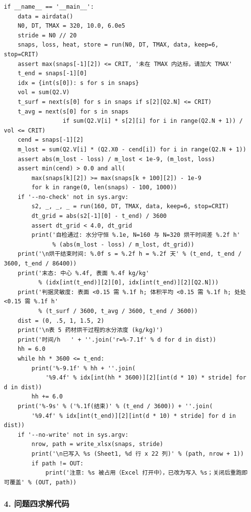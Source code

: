 \documentclass[12pt,a4paper]{article}
\begin{document}
\begin{lstlisting}
if __name__ == '__main__':
    data = airdata()
    N0, DT, TMAX = 320, 10.0, 6.0e5         
    stride = N0 // 20
    snaps, loss, heat, store = run(N0, DT, TMAX, data, keep=6, stop=CRIT)
    assert max(snaps[-1][2]) <= CRIT, '未在 TMAX 内达标，请加大 TMAX'
    t_end = snaps[-1][0]
    idx = {int(s[0]): s for s in snaps}
    vol = sum(Q2.V)
    t_surf = next(s[0] for s in snaps if s[2][Q2.N] <= CRIT)
    t_avg = next(s[0] for s in snaps
                 if sum(Q2.V[i] * s[2][i] for i in range(Q2.N + 1)) / vol <= CRIT)
    cend = snaps[-1][2]
    m_lost = sum(Q2.V[i] * (Q2.X0 - cend[i]) for i in range(Q2.N + 1))
    assert abs(m_lost - loss) / m_lost < 1e-9, (m_lost, loss)
    assert min(cend) > 0.0 and all(
        max(snaps[k][2]) >= max(snaps[k + 100][2]) - 1e-9
        for k in range(0, len(snaps) - 100, 1000))
    if '--no-check' not in sys.argv:
        s2, _, _, _ = run(160, DT, TMAX, data, keep=6, stop=CRIT)
        dt_grid = abs(s2[-1][0] - t_end) / 3600
        assert dt_grid < 4.0, dt_grid
        print('自检通过: 水分守恒 %.1e, N=160 与 N=320 烘干时间差 %.2f h'
              % (abs(m_lost - loss) / m_lost, dt_grid))
    print('\n烘干结束时间: %.0f s = %.2f h = %.2f 天' % (t_end, t_end / 3600, t_end / 86400))
    print('末态: 中心 %.4f, 表面 %.4f kg/kg'
          % (idx[int(t_end)][2][0], idx[int(t_end)][2][Q2.N]))
    print('判据灵敏度: 表面 <0.15 需 %.1f h; 体积平均 <0.15 需 %.1f h; 处处 <0.15 需 %.1f h'
          % (t_surf / 3600, t_avg / 3600, t_end / 3600))
    dist = (0, .5, 1, 1.5, 2)
    print('\n表 5 药材烘干过程的水分浓度 (kg/kg)')
    print('时间/h   ' + ''.join('r=%-7.1f' % d for d in dist))
    hh = 6.0
    while hh * 3600 <= t_end:
        print('%-9.1f' % hh + ''.join(
            '%9.4f' % idx[int(hh * 3600)][2][int(d * 10) * stride] for d in dist))
        hh += 6.0
    print('%-9s' % ('%.1f(结束)' % (t_end / 3600)) + ''.join(
        '%9.4f' % idx[int(t_end)][2][int(d * 10) * stride] for d in dist))
    if '--no-write' not in sys.argv:
        nrow, path = write_xlsx(snaps, stride)
        print('\n已写入 %s (Sheet1, %d 行 x 22 列)' % (path, nrow + 1))
        if path != OUT:
            print('注意: %s 被占用（Excel 打开中），已改为写入 %s；关闭后重跑即可覆盖' % (OUT, path))

\end{lstlisting}

\subsubsection*{4. 问题四求解代码}
\end{document}
